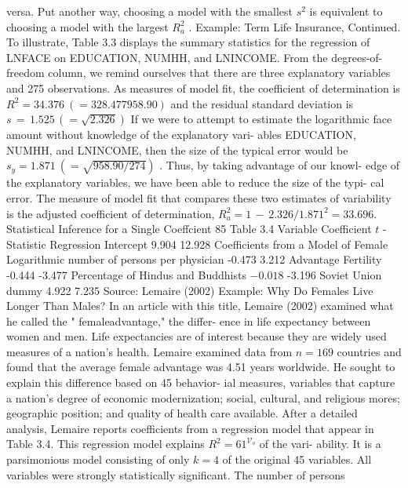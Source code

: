 \documentclass[11pt]{article}
\begin{document}
versa. Put another way, choosing a model with the smallest \(s^{2}\) is equivalent to
choosing a model with the largest \(R_{a}^{2}\) .
Example: Term Life Insurance, Continued. To illustrate, Table 3.3 displays the
 summary statistics for the regression of LNFACE on EDUCATION, NUMHH,
and LNINCOME. From the degrees-of-freedom column, we remind ourselves
 that there are three explanatory variables and 275 observations. As measures of
model fit, the coefficient of determination is \(R^{2}=3 4 . 3 7 6 ~ ( \mathrm{=} 3 2 8 . 4 7 7 9 5 8 . 9 0 )\) and
 the residual standard deviation is \(s \,=\, 1 . 5 2 5 \, (=\sqrt{2 . 3 2 6} )\) If we were to attempt to
 estimate the logarithmic face amount without knowledge of the explanatory vari-
 ables EDUCATION, NUMHH, and LNINCOME, then the size of the typical error 
would be \(s_{y}=1 . 8 7 1 \: (=\sqrt{9 5 8 . 9 0 / 2 7 4} )\) . Thus, by taking advantage of our knowl-
 edge of the explanatory variables, we have been able to reduce the size of the typi-
 cal error. The measure of model fit that compares these two estimates of variability
 is the adjusted coefficient of determination, \(R_{a}^{2}=1 \,-\, 2 . 3 2 6 / 1 . 8 7 1^{2}=3 3 . 6 9 6 .\)
 Statistical Inference for a Single Coeffcient 85
Table 3.4
Variable Coefficient \(t\) -Statistic Regression
Intercept 9.904 12.928 Coefficients from a
 Model of Female
Logarithmic number of persons per physician -0.473 3.212 Advantage
Fertility -0.444 -3.477
Percentage of Hindus and Buddhists \(- 0 . 0 1 8\) -3.196
 Soviet Union dummy 4.922 7.235
Source: Lemaire (2002)
Example: Why Do Females Live Longer Than Males? In an article with this
 title, Lemaire (2002) examined what he called the " femaleadvantage," the differ-
 ence in life expectancy between women and men. Life expectancies are of interest
because they are widely used measures of a nation's health. Lemaire examined
 data from \(n=1 6 9\) countries and found that the average female advantage was
 4.51 years worldwide. He sought to explain this difference based on 45 behavior-
 ial measures, variables that capture a nation's degree of economic modernization;
social, cultural, and religious mores; geographic position; and quality of health
 care available.
 After a detailed analysis, Lemaire reports coefficients from a regression model
that appear in Table 3.4. This regression model explains \(R^{2}=6 1^{\mathcal{V}_{o}}\) of the vari-
ability. It is a parsimonious model consisting of only \(k=4\) of the original 45
variables.
All variables were strongly statistically significant. The number of persons
\end{document}
